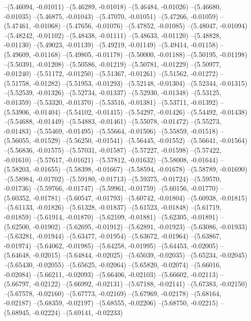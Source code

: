 --(5.46094, -0.01011)
--(5.46289, -0.01018)
--(5.46484, -0.01026)
--(5.46680, -0.01035)
--(5.46875, -0.01043)
--(5.47070, -0.01051)
--(5.47266, -0.01059)
--(5.47461, -0.01068)
--(5.47656, -0.01076)
--(5.47852, -0.01085)
--(5.48047, -0.01094)
--(5.48242, -0.01102)
--(5.48438, -0.01111)
--(5.48633, -0.01120)
--(5.48828, -0.01130)
--(5.49023, -0.01139)
--(5.49219, -0.01149)
--(5.49414, -0.01158)
--(5.49609, -0.01168)
--(5.49805, -0.01178)
--(5.50000, -0.01188)
--(5.50195, -0.01198)
--(5.50391, -0.01208)
--(5.50586, -0.01219)
--(5.50781, -0.01229)
--(5.50977, -0.01240)
--(5.51172, -0.01250)
--(5.51367, -0.01261)
--(5.51562, -0.01272)
--(5.51758, -0.01282)
--(5.51953, -0.01293)
--(5.52148, -0.01304)
--(5.52344, -0.01315)
--(5.52539, -0.01326)
--(5.52734, -0.01337)
--(5.52930, -0.01348)
--(5.53125, -0.01359)
--(5.53320, -0.01370)
--(5.53516, -0.01381)
--(5.53711, -0.01392)
--(5.53906, -0.01404)
--(5.54102, -0.01415)
--(5.54297, -0.01426)
--(5.54492, -0.01438)
--(5.54688, -0.01449)
--(5.54883, -0.01461)
--(5.55078, -0.01472)
--(5.55273, -0.01483)
--(5.55469, -0.01495)
--(5.55664, -0.01506)
--(5.55859, -0.01518)
--(5.56055, -0.01529)
--(5.56250, -0.01541)
--(5.56445, -0.01552)
--(5.56641, -0.01564)
--(5.56836, -0.01575)
--(5.57031, -0.01587)
--(5.57227, -0.01598)
--(5.57422, -0.01610)
--(5.57617, -0.01621)
--(5.57812, -0.01632)
--(5.58008, -0.01644)
--(5.58203, -0.01655)
--(5.58398, -0.01667)
--(5.58594, -0.01678)
--(5.58789, -0.01690)
--(5.58984, -0.01702)
--(5.59180, -0.01713)
--(5.59375, -0.01724)
--(5.59570, -0.01736)
--(5.59766, -0.01747)
--(5.59961, -0.01759)
--(5.60156, -0.01770)
--(5.60352, -0.01781)
--(5.60547, -0.01793)
--(5.60742, -0.01804)
--(5.60938, -0.01815)
--(5.61133, -0.01826)
--(5.61328, -0.01837)
--(5.61523, -0.01848)
--(5.61719, -0.01859)
--(5.61914, -0.01870)
--(5.62109, -0.01881)
--(5.62305, -0.01891)
--(5.62500, -0.01902)
--(5.62695, -0.01912)
--(5.62891, -0.01923)
--(5.63086, -0.01933)
--(5.63281, -0.01944)
--(5.63477, -0.01954)
--(5.63672, -0.01964)
--(5.63867, -0.01974)
--(5.64062, -0.01985)
--(5.64258, -0.01995)
--(5.64453, -0.02005)
--(5.64648, -0.02015)
--(5.64844, -0.02025)
--(5.65039, -0.02035)
--(5.65234, -0.02045)
--(5.65430, -0.02055)
--(5.65625, -0.02064)
--(5.65820, -0.02074)
--(5.66016, -0.02084)
--(5.66211, -0.02093)
--(5.66406, -0.02103)
--(5.66602, -0.02113)
--(5.66797, -0.02122)
--(5.66992, -0.02131)
--(5.67188, -0.02141)
--(5.67383, -0.02150)
--(5.67578, -0.02160)
--(5.67773, -0.02169)
--(5.67969, -0.02178)
--(5.68164, -0.02187)
--(5.68359, -0.02197)
--(5.68555, -0.02206)
--(5.68750, -0.02215)
--(5.68945, -0.02224)
--(5.69141, -0.02233)
